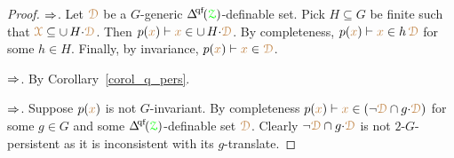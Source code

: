 \begin{proof}
  $\Rightarrow$.
  Let ${\color{brown}\EuScript D}$ be a $G$-generic $\qfDelta(\grZ)$-definable set.
  Pick $H\subseteq G$ be finite such that ${\color{brown}\EuScript X}\subseteq\cup\,H{\cdot}{\color{brown}\EuScript D}$.
  Then $p({\color{brown} x})\vdash {\color{brown}x}\in\cup\,H{\cdot}{\color{brown}\EuScript D}$.
  By completeness, $p({\color{brown} x})\vdash {\color{brown}x}\in h\,{\color{brown}\EuScript D}$ for some $h\in H$.
  Finally, by invariance, $p({\color{brown} x})\vdash{\color{brown}x}\in{\color{brown}\EuScript D}$.
  
  $\Rightarrow$.
  By Corollary~\ref{corol_q_pers}.

  $\Rightarrow$.
  Suppose $p({\color{brown} x})$ is not $G$-invariant.
  By completeness $p({\color{brown} x})\vdash{\color{brown}x}\in(\neg{\color{brown}\EuScript D}\cap g{\cdot}{\color{brown}\EuScript D})$ for some $g\in G$ and some $\qfDelta(\grZ)$-definable set ${\color{brown}\EuScript D}$.
  Clearly $\neg{\color{brown}\EuScript D}\cap g{\cdot}{\color{brown}\EuScript D}$ is not $2$-$G$-persistent as it is inconsistent with its $g$-translate.
\end{proof}




